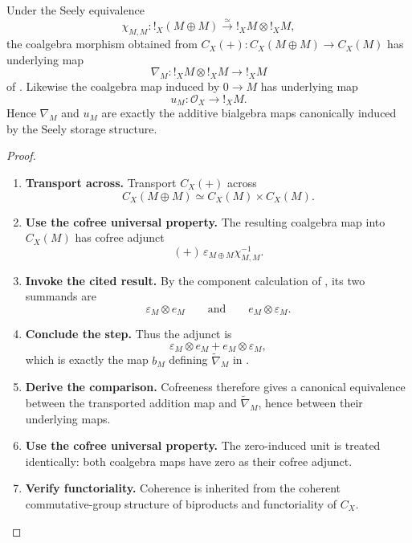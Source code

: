 \begin{proposition}
\label{prop:cofree-additive-storage-identification}
Under the Seely equivalence
\[
    \chi_{M,M}:!_X(M\oplus M)\xrightarrow{\simeq}!_XM\otimes !_XM,
\]
the coalgebra morphism obtained from
\(C_X(+):C_X(M\oplus M)\to C_X(M)\) has underlying map
\[
    \nabla_M:!_XM\otimes !_XM\longrightarrow !_XM
\]
of . Likewise the coalgebra map
induced by \(0\to M\) has underlying map
\[
    u_M:\mathcal O_X\longrightarrow !_XM.
\]
Hence \(\nabla_M\) and \(u_M\) are exactly the additive bialgebra maps
canonically induced by the Seely storage structure.
\end{proposition}

\begin{proof}
\leavevmode
\begin{enumerate}[label=\textup{(\arabic*)}]
    \item \textbf{Transport across.}
    Transport \(C_X(+)\) across
    \[
        C_X(M\oplus M)\simeq C_X(M)\times C_X(M).
    \]

    \item \textbf{Use the cofree universal property.}
    The resulting coalgebra map into \(C_X(M)\) has cofree adjunct
    \[
        (+)\,\varepsilon_{M\oplus M}\chi^{-1}_{M,M}.
    \]

    \item \textbf{Invoke the cited result.}
    By the component calculation of , its two summands are
    \[
        \varepsilon_M\otimes e_M
        \qquad\text{and}\qquad
        e_M\otimes\varepsilon_M.
    \]

    \item \textbf{Conclude the step.}
    Thus the adjunct is
    \[
        \varepsilon_M\otimes e_M+e_M\otimes\varepsilon_M,
    \]
    which is exactly the map \(b_M\) defining \(\widetilde\nabla_M\) in
    .

    \item \textbf{Derive the comparison.}
    Cofreeness therefore gives a canonical equivalence between the transported addition map and
    \(\widetilde\nabla_M\), hence between their underlying maps.

    \item \textbf{Use the cofree universal property.}
    The zero-induced unit is treated identically: both coalgebra maps have zero as their cofree
    adjunct.

    \item \textbf{Verify functoriality.}
    Coherence is inherited from the coherent commutative-group structure of biproducts and
    functoriality of \(C_X\).
\end{enumerate}
\end{proof}

